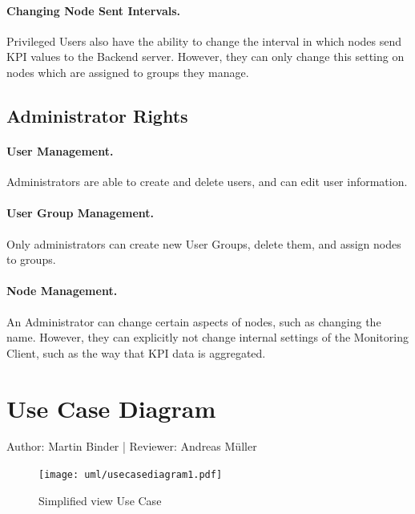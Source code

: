 \documentclass{scrreprt}
\begin{document}
\paragraph{Changing Node Sent Intervals.}
Privileged Users also have the ability to change the interval in which nodes send KPI values to the Backend server. However, they can only change this setting on nodes which are assigned to groups they manage.
\subsection{Administrator Rights}
\paragraph{User Management.} Administrators are able to create and delete users, and can edit user information.
\paragraph{User Group Management.} Only administrators can create new User Groups, delete them, and assign nodes to groups.
\paragraph{Node Management.} An Administrator can change certain aspects of nodes, such as changing the name. However, they can explicitly not change internal settings of the Monitoring Client, such as the way that KPI data is aggregated.
\section{Use Case Diagram}
Author: Martin Binder | Reviewer: Andreas M\"uller
\begin{figure}[h!]
	\texttt{[image: uml/usecasediagram1.pdf]}
	\caption{Simplified view Use Case}
	\label{usecase1}
\end{figure}	
\end{document}
